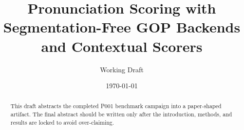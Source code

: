 \documentclass[11pt]{article}
\title{Pronunciation Scoring with Segmentation-Free GOP Backends and Contextual Scorers}
\author{Working Draft}
\date{\today}
\begin{document}
\maketitle

\begin{abstract}
This draft abstracts the completed P001 benchmark campaign into a paper-shaped
artifact. The final abstract should be written only after the introduction,
methods, and results are locked to avoid over-claiming.
\end{abstract}












\end{document}
